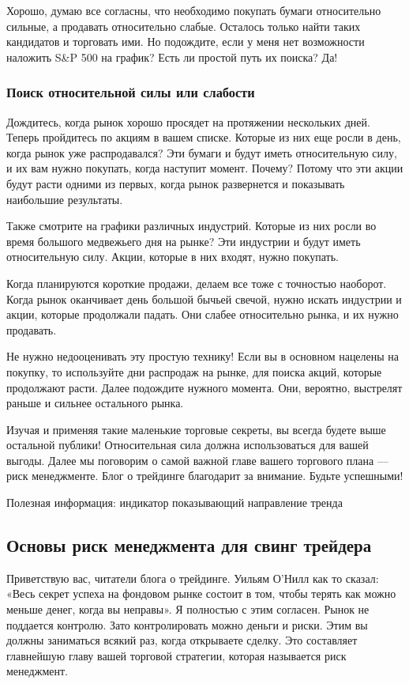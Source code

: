 \documentclass[a5paper]{article}
\begin{document}
Хорошо, думаю все согласны, что необходимо покупать бумаги относительно сильные, а продавать относительно слабые. Осталось только найти таких кандидатов и торговать ими. Но подождите, если у меня нет возможности наложить S\&P 500 на график? Есть ли простой путь их поиска? Да!

\subsubsection{Поиск относительной силы или слабости}

Дождитесь, когда рынок хорошо просядет на протяжении нескольких дней. Теперь пройдитесь по акциям в вашем списке. Которые из них еще росли в день, когда рынок уже распродавался? Эти бумаги и будут иметь относительную силу, и их вам нужно покупать, когда наступит момент. Почему? Потому что эти акции будут расти одними из первых, когда рынок развернется и показывать наибольшие результаты.

Также смотрите на графики различных индустрий. Которые из них росли во время большого медвежьего дня на рынке? Эти индустрии и будут иметь относительную силу. Акции, которые в них входят, нужно покупать.

Когда планируются короткие продажи, делаем все тоже с точностью наоборот.  Когда рынок оканчивает день большой бычьей свечой, нужно искать индустрии и акции, которые продолжали падать. Они слабее относительно рынка, и их нужно продавать.

Не нужно недооценивать эту простую технику! Если вы в основном нацелены на покупку, то используйте дни распродаж на рынке, для поиска акций, которые продолжают расти. Далее подождите нужного момента. Они, вероятно, выстрелят раньше и сильнее остального рынка.

Изучая и применяя такие маленькие торговые секреты, вы всегда будете выше остальной публики! Относительная сила должна использоваться для вашей выгоды. Далее мы поговорим о самой важной главе вашего торгового плана — риск менеджменте. Блог о трейдинге благодарит за внимание. Будьте успешными!


Полезная информация: индикатор показывающий направление тренда

\subsection{Основы риск менеджмента для свинг трейдера}

Приветствую вас, читатели блога о трейдинге. Уильям О'Нилл как то сказал: «Весь секрет успеха на фондовом рынке состоит в том, чтобы терять как можно меньше денег, когда вы неправы». Я полностью с этим согласен. Рынок не поддается контролю. Зато контролировать можно деньги и риски. Этим вы должны заниматься всякий раз, когда открываете сделку. Это  составляет главнейшую главу вашей торговой стратегии, которая называется риск менеджмент.
\end{document}
